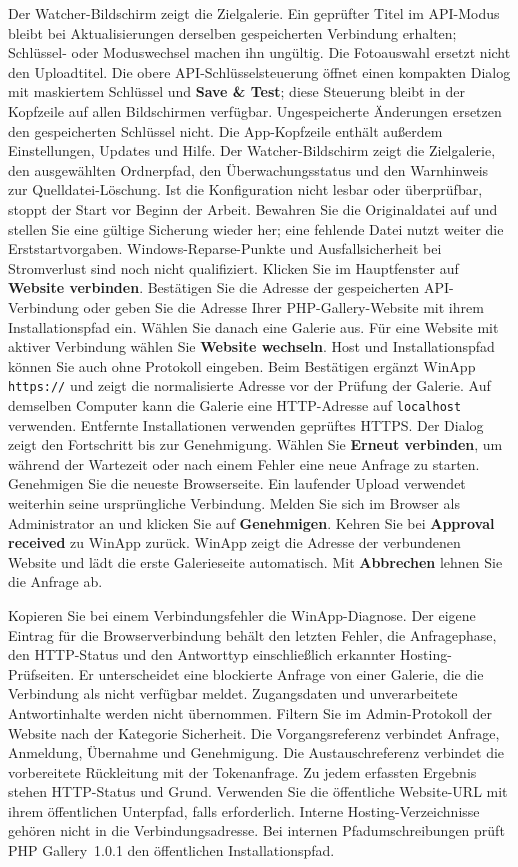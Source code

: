 \documentclass[11pt,a4paper]{article}
\newcommand{\ui}[1]{\textbf{#1}}
\begin{document}
Der Watcher-Bildschirm zeigt die Zielgalerie. Ein geprüfter Titel im API-Modus
bleibt bei Aktualisierungen derselben gespeicherten Verbindung erhalten;
Schlüssel- oder Moduswechsel machen ihn ungültig. Die Fotoauswahl ersetzt
nicht den Uploadtitel. Die obere API-Schlüsselsteuerung
öffnet einen kompakten Dialog mit maskiertem Schlüssel und \ui{Save \& Test};
diese Steuerung bleibt
in der Kopfzeile auf allen Bildschirmen verfügbar. Ungespeicherte Änderungen
ersetzen den gespeicherten Schlüssel nicht. Die App-Kopfzeile enthält außerdem
Einstellungen, Updates und Hilfe. Der Watcher-Bildschirm zeigt die Zielgalerie,
den ausgewählten Ordnerpfad, den Überwachungsstatus und den Warnhinweis zur
Quelldatei-Löschung.
Ist die Konfiguration nicht lesbar oder überprüfbar, stoppt der Start vor
Beginn der Arbeit. Bewahren Sie die Originaldatei auf und stellen Sie eine
gültige Sicherung wieder her; eine fehlende Datei nutzt weiter die
Erststartvorgaben. Windows-Reparse-Punkte und Ausfallsicherheit bei Stromverlust
sind noch nicht qualifiziert.
Klicken Sie im Hauptfenster auf \ui{Website verbinden}. Bestätigen Sie die
Adresse der gespeicherten API-Verbindung oder geben Sie die Adresse Ihrer
PHP-Gallery-Website mit ihrem Installationspfad ein. Wählen Sie danach eine
Galerie aus.
Für eine Website mit aktiver Verbindung wählen Sie \ui{Website wechseln}.
Host und Installationspfad können Sie auch ohne Protokoll eingeben.
Beim Bestätigen ergänzt WinApp \texttt{https://} und zeigt die normalisierte
Adresse vor der Prüfung der Galerie. Auf demselben
Computer kann die Galerie eine HTTP-Adresse auf \texttt{localhost} verwenden.
Entfernte Installationen verwenden geprüftes HTTPS.
Der Dialog zeigt den Fortschritt bis zur Genehmigung. Wählen Sie
\ui{Erneut verbinden}, um während der Wartezeit oder nach einem Fehler
eine neue Anfrage zu starten. Genehmigen Sie die neueste Browserseite.
Ein laufender Upload verwendet weiterhin seine ursprüngliche Verbindung.
Melden Sie sich im Browser als Administrator an und klicken
Sie auf \ui{Genehmigen}. Kehren Sie bei \ui{Approval received} zu WinApp
zurück. WinApp zeigt die Adresse der verbundenen Website und lädt die erste
Galerieseite automatisch. Mit \ui{Abbrechen} lehnen Sie die Anfrage ab.

Kopieren Sie bei einem Verbindungsfehler die WinApp-Diagnose. Der eigene
Eintrag für die Browserverbindung behält den letzten Fehler, die
Anfragephase, den HTTP-Status und den Antworttyp einschließlich erkannter
Hosting-Prüfseiten. Er unterscheidet eine blockierte Anfrage von einer
Galerie, die die Verbindung als nicht verfügbar meldet. Zugangsdaten und
unverarbeitete Antwortinhalte werden nicht übernommen.
Filtern Sie im Admin-Protokoll der Website nach der Kategorie Sicherheit.
Die Vorgangsreferenz verbindet Anfrage, Anmeldung, Übernahme und Genehmigung.
Die Austauschreferenz verbindet die vorbereitete Rückleitung mit der
Tokenanfrage. Zu jedem erfassten Ergebnis stehen HTTP-Status und Grund.
Verwenden Sie die öffentliche Website-URL mit ihrem öffentlichen Unterpfad,
falls erforderlich. Interne Hosting-Verzeichnisse gehören nicht in die
Verbindungsadresse. Bei internen Pfadumschreibungen prüft PHP Gallery~1.0.1
den öffentlichen Installationspfad.
\end{document}
